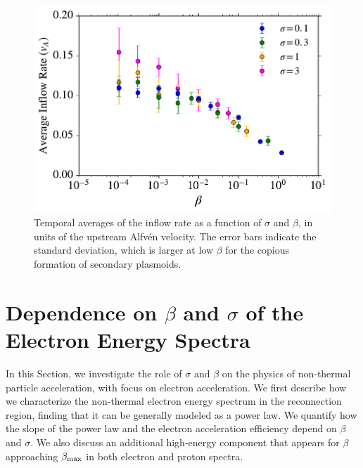 


\begin{figure}[t]
	\centering
\includegraphics[width =\textwidth]{inflow_rates_over_va.pdf}
	\caption{Temporal averages of the inflow rate as a function of $\sigma$ and $\beta$, in units of the upstream Alfv\'en velocity.  The error bars indicate the standard deviation, which is larger at low $\beta$ for the copious formation of secondary plasmoids.}
    \label{inflow_rates_over_Va}
\end{figure}


\section{Dependence on  $\beta$ and $\sigma$ of the Electron Energy Spectra}\label{energy_spectra}
In this Section, we investigate the role of $\sigma$ and $\beta$ on the physics of non-thermal particle acceleration, with focus on electron acceleration. We first describe how we characterize the non-thermal electron energy spectrum in the reconnection region, finding that it can be generally modeled as a power law. We quantify how the slope of the power law and the electron acceleration efficiency depend on $\beta$ and $\sigma$. We also discuss an additional high-energy component that appears for $\beta$ approaching $\beta_{\rm max}$ in both electron and proton spectra.

